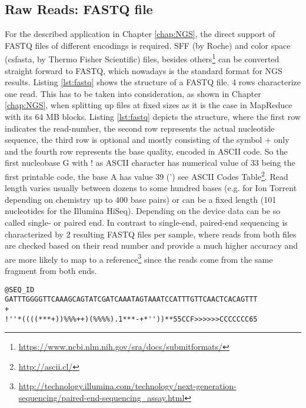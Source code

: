 \subsection{Raw Reads: FASTQ file}
For the described application in Chapter \ref{chap:NGS}, the  direct support of FASTQ files of different encodings is required. SFF (by Roche) and color space (csfasta, by Thermo Fisher Scientific) files, besides others\footnote{\url{https://www.ncbi.nlm.nih.gov/sra/docs/submitformats/}} can be converted straight forward to FASTQ, which nowadays is the standard format for NGS results.  
Listing \ref{lst:fastq} shows the structure of a FASTQ file. 4 rows characterize one read. This has to be taken into consideration, as shown in Chapter \ref{chap:NGS}, when splitting up files at fixed sizes as it is the case in MapReduce with its 64 MB blocks. Listing \ref{lst:fastq} depicts the structure, where the first row indicates the read-number, the second row represents the actual nucleotide sequence, the third row is optional and mostly consisting of the symbol {+} only and the fourth row represents the base quality, encoded in ASCII code. So the first nucleobase G with ! as ASCII character has numerical value of 33 being the first printable code, the base A has value 39 (') see  ASCII Codes Table\footnote{\url{http://ascii.cl/}}. Read length varies usually between dozens to some hundred bases (e.g. for Ion Torrent depending on chemistry up to 400 base pairs) or can be a fixed length (101 nucleotides for the Illumina HiSeq). Depending on the device data can be so called single- or paired end. In contrast to single-end, paired-end sequencing is characterized by 2 resulting FASTQ files per sample, where reads from both files are checked based on their read number and provide a much higher accuracy and are more likely to map to a reference\footnote{\url{http://technology.illumina.com/technology/next-generation-sequencing/paired-end-sequencing_assay.html}} since the reads come from the same fragment from both ends.
\begin{lstlisting}[caption= {Excerpt of an FASTQ file, 4 rows representing one read}, label={lst:fastq}]
@SEQ_ID
GATTTGGGGTTCAAAGCAGTATCGATCAAATAGTAAATCCATTTGTTCAACTCACAGTTT
+
!''*((((***+))%%%++)(%%%%).1***-+*''))**55CCF>>>>>>CCCCCCC65
\end{lstlisting}
